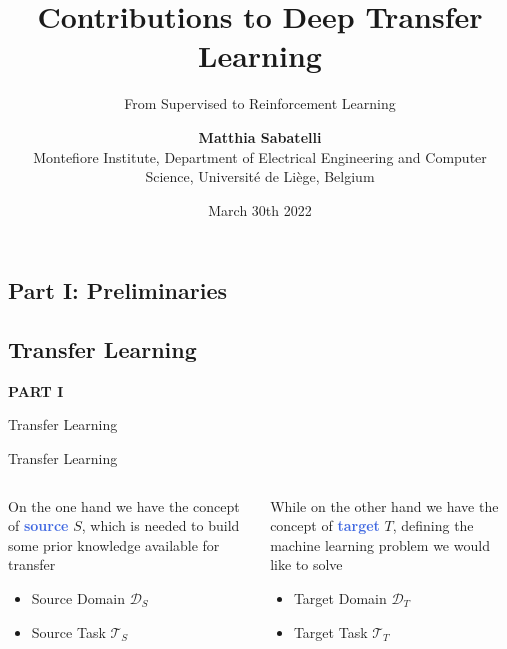 \documentclass{beamer}
\title{Contributions to Deep Transfer Learning}
\subtitle{From Supervised to Reinforcement Learning}
\author{\textbf{Matthia Sabatelli} \\ Montefiore Institute, Department of Electrical Engineering and Computer Science, Universit\'e de Li\`ege, Belgium}
\date{March 30th 2022}
\begin{document}
\frame{\titlepage} 


\begin{frame}
	\section{Part I: Preliminaries}
	\subsection{Transfer Learning}

	\begin{center}
		\textcolor{skymagenta}{\textbf{PART I}}
	\end{center}
\end{frame}

\begin{frame}{Transfer Learning}

\end{frame}


\begin{frame}{Transfer Learning}
	


	\begin{columns}
		\begin{column}{.5\textwidth}
			On the one hand we have the concept of \textcolor{RoyalBlue}{\textbf{source}} $S$, which is needed to build some prior knowledge available for transfer
		
		\bigskip
		\begin{itemize}
			\item	Source Domain $\mathcal{D}_S$
			\item	Source Task $\mathcal{T}_S$
		\end{itemize}

		\end{column}
		
		\begin{column}{.5\textwidth}
			While on the other hand we have the concept of \textcolor{RoyalBlue}{\textbf{target}} $T$, defining the machine learning problem we would like to solve
		
		\bigskip
		\begin{itemize}
			\item Target Domain $\mathcal{D}_T$
			\item Target Task $\mathcal{T}_T$
		\end{itemize}


		\end{column}
		
	\end{columns}



\end{frame}
\end{document}
